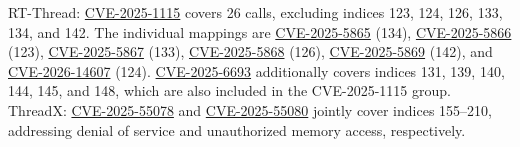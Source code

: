 \documentclass[conference]{IEEEtran}
\begin{document}
\begin{table}[!t]
\begin{threeparttable}
\begin{tablenotes}[flushleft]
RT-Thread: \href{https://www.cve.org/CVERecord?id=CVE-2025-1115}{CVE-2025-1115} covers 26 calls, excluding indices 123, 124, 126, 133, 134, and 142.
The individual mappings are \href{https://www.cve.org/CVERecord?id=CVE-2025-5865}{CVE-2025-5865} (134), \href{https://www.cve.org/CVERecord?id=CVE-2025-5866}{CVE-2025-5866} (123), \href{https://www.cve.org/CVERecord?id=CVE-2025-5867}{CVE-2025-5867} (133), \href{https://www.cve.org/CVERecord?id=CVE-2025-5868}{CVE-2025-5868} (126), \href{https://www.cve.org/CVERecord?id=CVE-2025-5869}{CVE-2025-5869} (142), and \href{https://www.cve.org/CVERecord?id=CVE-2026-14607}{CVE-2026-14607} (124).
\href{https://www.cve.org/CVERecord?id=CVE-2025-6693}{CVE-2025-6693} additionally covers indices 131, 139, 140, 144, 145, and 148, which are also included in the CVE-2025-1115 group.
ThreadX: \href{https://www.cve.org/CVERecord?id=CVE-2025-55078}{CVE-2025-55078} and \href{https://www.cve.org/CVERecord?id=CVE-2025-55080}{CVE-2025-55080} jointly cover indices 155--210, addressing denial of service and unauthorized memory access, respectively.
\end{tablenotes}
\end{threeparttable}

\end{table}
\end{document}

